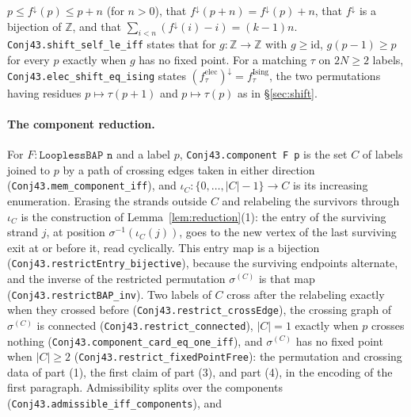 \documentclass[11pt]{article}
\theoremstyle{definition}
\newcommand{\Z}{\mathbb{Z}}
\begin{document}
$p\le f^\downarrow(p)\le p+n$ (for $n>0$), that $f^\downarrow(p+n)=f^\downarrow(p)+n$, that $f^\downarrow$ is a
bijection of $\Z$, and that $\sum_{i<n}(f^\downarrow(i)-i)=(k-1)n$.
\texttt{Conj43.\allowbreak shift\_\allowbreak self\_\allowbreak le\_\allowbreak iff} states that for $g:\Z\to\Z$ with $g\ge\mathrm{id}$,
$g(p-1)\ge p$ for every $p$ exactly when $g$ has no fixed point. For a matching $\tau$ on $2N\ge2$ labels,
\texttt{Conj43.\allowbreak elec\_\allowbreak shift\_\allowbreak eq\_\allowbreak ising} states $(f_\tau^{\mathrm{elec}})^\downarrow=f_\tau^{\mathrm{Ising}}$,
the two permutations having residues $p\mapsto\tau(p+1)$ and $p\mapsto\tau(p)$ as in \S\ref{sec:shift}.

\paragraph{The component reduction.}
For $F:\texttt{LooplessBAP n}$ and a label $p$, \texttt{Conj43.\allowbreak component F p} is the set $C$ of labels
joined to $p$ by a path of crossing edges taken in either direction (\texttt{Conj43.\allowbreak mem\_\allowbreak component\_\allowbreak iff}), and
$\iota_C\colon\{0,\ldots,|C|-1\}\to C$ is its increasing enumeration. Erasing the strands outside $C$ and relabeling
the survivors through $\iota_C$ is the construction of Lemma~\ref{lem:reduction}(1): the entry of the surviving strand
$j$, at position $\sigma^{-1}(\iota_C(j))$, goes to the new vertex of the last surviving exit at or before it, read
cyclically. This entry map is a bijection (\texttt{Conj43.\allowbreak restrictEntry\_\allowbreak bijective}), because the surviving endpoints alternate,
and the inverse of the restricted permutation $\sigma^{(C)}$ is that map (\texttt{Conj43.\allowbreak restrictBAP\_\allowbreak inv}). Two labels of $C$ cross
after the relabeling exactly when they crossed before (\texttt{Conj43.\allowbreak restrict\_\allowbreak crossEdge}), the crossing graph of $\sigma^{(C)}$
is connected (\texttt{Conj43.\allowbreak restrict\_\allowbreak connected}), $|C|=1$ exactly when $p$ crosses nothing (\texttt{Conj43.\allowbreak component\_\allowbreak card\_\allowbreak eq\_\allowbreak one\_\allowbreak iff}), and
$\sigma^{(C)}$ has no fixed point when $|C|\ge2$ (\texttt{Conj43.\allowbreak restrict\_\allowbreak fixedPointFree}): the permutation and crossing data of part (1), the first claim of part (3), and part (4), in the
encoding of the first paragraph. Admissibility splits over the components (\texttt{Conj43.\allowbreak admissible\_\allowbreak iff\_\allowbreak components}), and
\end{document}
